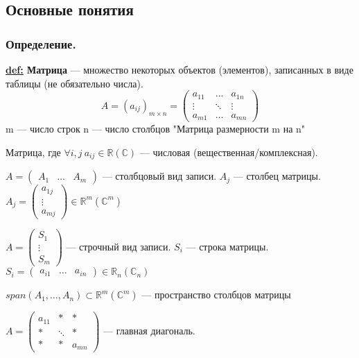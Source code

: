 
\subsection{Основные понятия}
\subsubsection{Определение.}
\textbf{\underline{def:} Матрица} --- множество некоторых объектов (элементов), записанных в виде таблицы (не обязательно числа).
\[ A = (a_{ij})_{m \times n} =
    \begin{pmatrix}
        a_{11} & \ldots & a_{1n} \\
        \vdots & \ddots & \vdots \\
        a_{m1} & \ldots & a_{mn}
    \end{pmatrix}\]
m --- число строк
n --- число столбцов
"Матрица размерности m на n"

Матрица, где $ \forall i,j\ a_{ij} \in \mathbb{R}(\mathbb{C}) $ --- числовая (вещественная/комплексная).


\( A =
\begin{pmatrix}
    A_{1} & \ldots & A_{m}
\end{pmatrix}\) --- столбцовый вид записи.
$A_j$ --- столбец матрицы.
\( A_j =
\begin{pmatrix}
    a_{1j} \\
    \vdots \\
    a_{mj}
\end{pmatrix}
\in \mathbb{R}^m(\mathbb{C}^m)\)

\( A =
\begin{pmatrix}
    S_1    \\
    \vdots \\
    S_m
\end{pmatrix}\) --- строчный вид записи.
$S_i$ --- строка матрицы.
\( S_i =
\begin{pmatrix}
    a_{i1} & \ldots & a_{in}
\end{pmatrix}
\in \mathbb{R}_n(\mathbb{C}_n)\)

\( span(A_1, \ldots, A_n) \subset \mathbb{R}^m(\mathbb{C}^m)\) --- пространство столбцов матрицы


\( A =
\begin{pmatrix}
    a_{11} & *      & *      \\
    *      & \ddots & *      \\
    *      & *      & a_{mn}
\end{pmatrix}\) --- главная диагональ.


